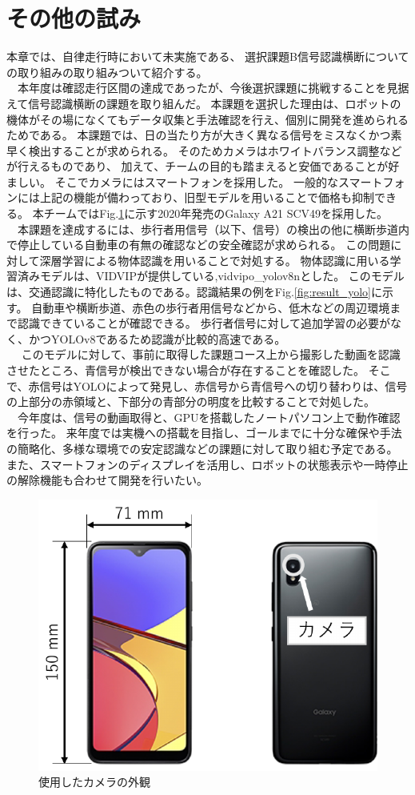 \documentclass[twocolumn,9pt]{jsproceedings}
\begin{document}
\section{その他の試み}
本章では、自律走行時において未実施である、
選択課題B信号認識横断についての取り組みの取り組みついて紹介する。
\\　本年度は確認走行区間の達成であったが、今後選択課題に挑戦することを見据えて信号認識横断の課題を取り組んだ。
本課題を選択した理由は、ロボットの機体がその場になくてもデータ収集と手法確認を行え、個別に開発を進められるためである。
本課題では、日の当たり方が大きく異なる信号をミスなくかつ素早く検出することが求められる。
そのためカメラはホワイトバランス調整などが行えるものであり、
加えて、チームの目的も踏まえると安価であることが好ましい。
そこでカメラにはスマートフォンを採用した。
一般的なスマートフォンには上記の機能が備わっており、旧型モデルを用いることで価格も抑制できる。
本チームではFig.\ref{fig:smartphone}に示す2020年発売のGalaxy A21 SCV49を採用した。
\\　本課題を達成するには、歩行者用信号（以下、信号）の検出の他に横断歩道内で停止している自動車の有無の確認などの安全確認が求められる。
この問題に対して深層学習による物体認識を用いることで対処する。
物体認識に用いる学習済みモデルは、VIDVIP\cite{BabaVIDVIP}が提供している,vidvipo\_yolov8nとした。
このモデルは、交通認識に特化したものである。認識結果の例をFig.\ref{fig:result_yolo}に示す。
自動車や横断歩道、赤色の歩行者用信号などから、低木などの周辺環境まで認識できていることが確認できる。
歩行者信号に対して追加学習の必要がなく、かつYOLOv8であるため認識が比較的高速である。
\\　
このモデルに対して、事前に取得した課題コース上から撮影した動画を認識させたところ、青信号が検出できない場合が存在することを確認した。
そこで、赤信号はYOLOによって発見し、赤信号から青信号への切り替わりは、信号の上部分の赤領域と、下部分の青部分の明度を比較することで対処した。
\\　今年度は、信号の動画取得と、GPUを搭載したノートパソコン上で動作確認を行った。
来年度では実機への搭載を目指し、ゴールまでに十分な確保や手法の簡略化、多様な環境での安定認識などの課題に対して取り組む予定である。
また、スマートフォンのディスプレイを活用し、ロボットの状態表示や一時停止の解除機能も合わせて開発を行いたい。

\begin{figure}[h]
  \begin{center}
    \includegraphics[width=0.6\linewidth]{figs/smartphone.pdf}
    \caption{使用したカメラの外観}
    \label{fig:smartphone}
  \end{center}
\end{figure}
\end{document}
